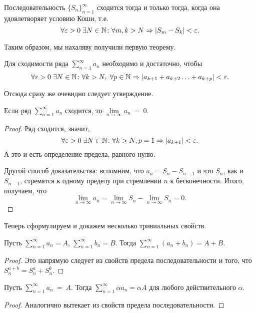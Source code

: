\begin{Examples}
	Последовательность $\{S_n\}_{n=1}^\infty$ сходится тогда и только тогда, когда она удовлетворяет условию Коши, т.е.
	$$
	\forall \varepsilon>0\; \exists N\in \mathbb{N}\colon \forall m,k > N \Rightarrow |S_m - S_k|<\varepsilon.
	$$
\end{Examples}
Таким образом, мы нахаляву получили первую теорему.
\begin{Theorem}
	Для сходимости ряда $\sum\limits_{n=1}^{\infty} a_n$ необходимо и достаточно, чтобы 
	$$
	\forall \varepsilon>0\; \exists N\in \mathbb{N}\colon \forall k>N,\; \forall p\in \mathbb{N} \Rightarrow  |a_{k+1} + a_{k+2} \ldots + a_{k+p}| < \varepsilon.
	$$
	
\end{Theorem}
Отсюда сразу же очевидно следует утверждение.
\begin{Statement}
	Если ряд $\sum\limits_{n=1}^{\infty} a_n$ сходится, то $\lim\limits_{n\to \infty} a_n~=~0$.
\end{Statement}
\begin{proof}
	Ряд сходится, значит,
	$$
	\forall \varepsilon>0\; \exists N \in \mathbb{N}\colon \forall k>N, p = 1 \Rightarrow |a_{k+1}| < \varepsilon.
	$$
	А это и есть определение предела, равного нулю.
	\par Другой способ доказательства: вспомним, что $a_n = S_n - S_{n-1}$ и что $S_n$, как и $S_{n-1}$, стремятся к одному пределу при стремлении $n$ к бесконечности. Итого, получаем, что 
	$$
	\lim\limits_{n \to \infty} a_n = \lim\limits_{n\to \infty} S_n - \lim\limits_{n\to \infty} S_n = 0.
	$$
\end{proof}

Теперь сформулируем и докажем несколько тривиальных свойств.
\begin{Properties}
	Пусть $\sum\limits_{n = 1}^{\infty}a_n = A$, $\sum\limits_{n = 1}^{\infty}b_n = B$. Тогда $\sum\limits_{n = 1}^{\infty}\left(a_n + b_n\right) = A + B$.
\end{Properties}
\begin{proof}
	Это напрямую следует из свойств предела последовательности и того, что $S^{a+b}_n = S_n^a + S_n^b$.
\end{proof}
\begin{Properties}
	Пусть $\sum\limits_{n = 1}^{\infty} a_n~=~A$. Тогда $\sum\limits_{n = 1}^{\infty} \alpha a_n = \alpha A$ для любого действительного $\alpha$.
\end{Properties}
\begin{proof}
	Аналогично вытекает из свойств предела последовательности.
\end{proof}

